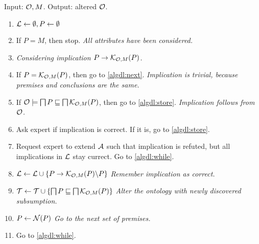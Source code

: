 \documentclass{llncs}
\newcommand{\pc}{\ensuremath\mathcal{K}}
\newcommand{\soi}{\ensuremath\mathcal{L}}
\newcommand{\next}{\ensuremath\mathcal{N}}
\newcommand{\ont}{\ensuremath\mathcal{O}}
\newcommand{\tbox}{\ensuremath\mathcal{T}}
\newcommand{\abox}{\ensuremath\mathcal{A}}
\newcommand{\comment}[1]{\emph{#1}}
\begin{document}
\begin{definition}
Input: $\ont, M$. Output: altered $\ont$.
\begin{enumerate}
\item $\soi\leftarrow \emptyset, P\leftarrow \emptyset$
\item\label{algdl:while} If $P=M$, then stop. \comment{All attributes have been considered.}
\item \comment{Considering implication $P\to\pc_{\ont,M}(P)$.}
\item If $P=\pc_{\ont,M}(P)$, then go to \ref{algdl:next}. \comment{Implication is trivial, because premises and conclusions are the same.}
\item If $\ont\models \bigsqcap P \sqsubseteq \bigsqcap \pc_{\ont,M}(P)$, then go to \ref{algdl:store}. \comment{Implication follows from $\ont$.}
\item Ask expert if implication is correct. If it is, go to \ref{algdl:store}.
\item Request expert to extend $\abox$ such that implication is refuted, but all implications in $\soi$ stay currect. Go to \ref{algdl:while}.
\item \label{algdl:store} $\soi\leftarrow \soi\cup \{P\to\pc_{\ont,M}(P)\backslash P\}$ \comment{Remember implication as correct.}
\item $\tbox\leftarrow\tbox\cup\{\bigsqcap P \sqsubseteq \bigsqcap \pc_{\ont,M}(P)\}$ \comment{Alter the ontology with newly discovered subsumption.}
\item \label{algdl:next} $P\leftarrow \next(P)$ \comment{Go to the next set of premises.}
\item Go to \ref{algdl:while}.
\end{enumerate}
\end{definition}
\end{document}
